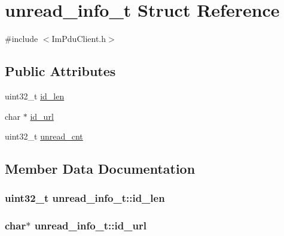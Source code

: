 \hypertarget{structunread__info__t}{}\section{unread\+\_\+info\+\_\+t Struct Reference}
\label{structunread__info__t}


{\ttfamily \#include $<$Im\+Pdu\+Client.\+h$>$}

\subsection*{Public Attributes}
\begin{DoxyCompactItemize}
\item 
uint32\+\_\+t \hyperlink{structunread__info__t_a3579e5ba7b53256e3de9913e376ada0b}{id\+\_\+len}
\item 
char $\ast$ \hyperlink{structunread__info__t_a257dc65a16e232e8929c571488cd3e0c}{id\+\_\+url}
\item 
uint32\+\_\+t \hyperlink{structunread__info__t_a9b901d7900e52b4287adcc7ae5029c56}{unread\+\_\+cnt}
\end{DoxyCompactItemize}


\subsection{Member Data Documentation}
\hypertarget{structunread__info__t_a3579e5ba7b53256e3de9913e376ada0b}{}
\subsubsection[{id\+\_\+len}]{\setlength{\rightskip}{0pt plus 5cm}uint32\+\_\+t unread\+\_\+info\+\_\+t\+::id\+\_\+len}\label{structunread__info__t_a3579e5ba7b53256e3de9913e376ada0b}
\hypertarget{structunread__info__t_a257dc65a16e232e8929c571488cd3e0c}{}
\subsubsection[{id\+\_\+url}]{\setlength{\rightskip}{0pt plus 5cm}char$\ast$ unread\+\_\+info\+\_\+t\+::id\+\_\+url}\label{structunread__info__t_a257dc65a16e232e8929c571488cd3e0c}
\hypertarget{structunread__info__t_a9b901d7900e52b4287adcc7ae5029c56}{}
